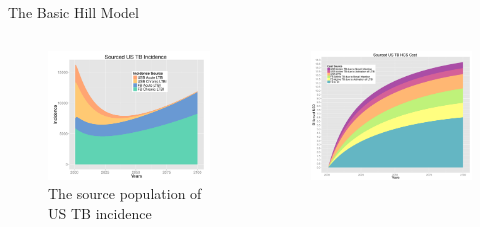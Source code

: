 \documentclass[final]{beamer}
\begin{document}
\begin{frame}
\begin{columns}[T]
\begin{column}{.3\textwidth}
\begin{block}{The Basic Hill Model}
        \begin{columns}
          \begin{column}{.47\textwidth}
            \begin{figure}[h]
              \begin{center}
                \includegraphics[width=\textwidth] {incPlotSourced2}
              \end{center}
              \caption{The source population of US TB incidence}
              \label{fig:incPlotSourced}
            \end{figure}
          \end{column}
          \begin{column}{.47\textwidth}
            \begin{figure}[h]
              \begin{center}
                \includegraphics[width=\textwidth]{costPlotSourced2}

\end{center}
\end{figure}
\end{column}
\end{columns}
\end{block}
\end{column}
\end{columns}
\end{frame}
\end{document}
